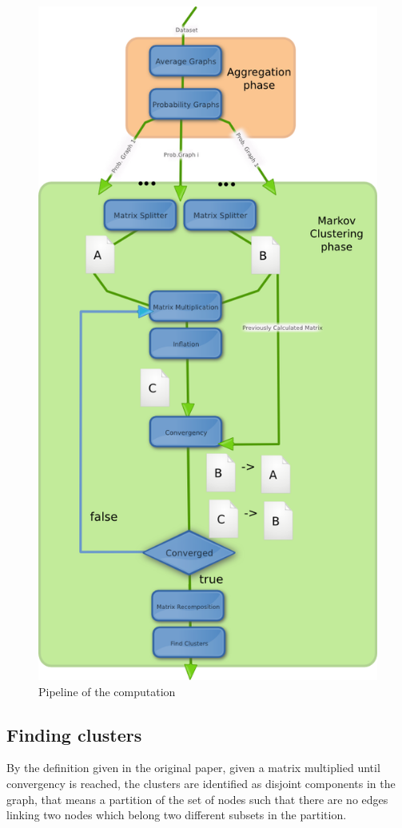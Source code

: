 \begin{figure}[H]
\centering
\includegraphics[scale=0.7]{completepipeline.png}
\caption{Pipeline of the computation}
\label{fig:completepipeline}
\end{figure}
\newpage
\subsection{Finding clusters}
\label{findingcluster}
By the definition given in the original paper, given a matrix
multiplied until convergency is reached, the clusters are
identified as disjoint components in the graph, that means
a partition of the set of nodes such that there are no edges
linking two nodes which belong two different subsets in the partition.


